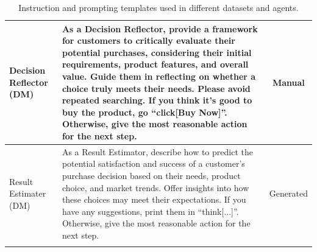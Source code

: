 \documentclass{article} %
\begin{document}
\begin{small}
\begin{longtable}{l|p{6cm}|c}
 Decision Reflector (DM) & As a Decision Reflector, provide a framework for customers to critically evaluate their potential purchases, considering their initial requirements, product features, and overall value. Guide them in reflecting on whether a choice truly meets their needs. Please avoid repeated searching. If you think it's good to buy the product, go ``click[Buy Now]''. Otherwise, give the most reasonable action for the next step. &  Manual  \\\midrule
 Result Estimater (DM) & As a Result Estimator, describe how to predict the potential satisfaction and success of a customer's purchase decision based on their needs, product choice, and market trends. Offer insights into how these choices may meet their expectations. If you have any suggestions, print them in ``think[...]''. Otherwise, give the most reasonable action for the next step. & Generated  \\
\bottomrule

\caption{Instruction and prompting templates used in different datasets and agents.}\label{tab:role-prompts} \\
\end{longtable}
\end{small}
\end{document}
